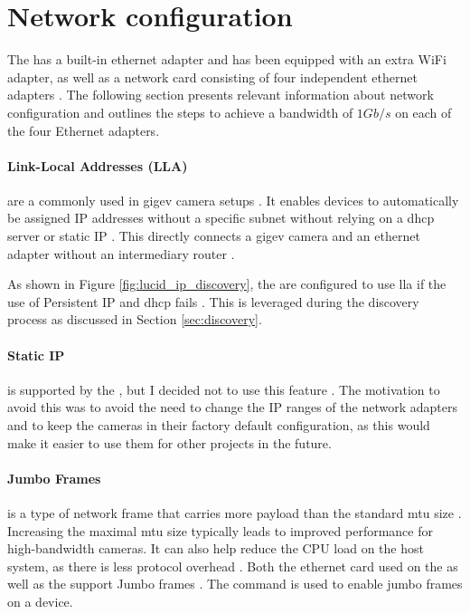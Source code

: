 \section{Network configuration}
\label{sec:network_configuration}
The \jx has a built-in ethernet adapter and has been equipped with an extra WiFi adapter, as well as a network card consisting of four independent ethernet adapters \cite[Section 6.5]{martensPortableSensorRig2022}.
The following section presents relevant information about network configuration and outlines the steps to achieve a bandwidth of $1Gb/s$ on each of the four Ethernet adapters.

\paragraph{Link-Local Addresses (LLA)} are a commonly used in \gls{gigev} camera setups \cite{teledyneSettingIPAddress01} \cite{lucidvisionlabsArenaSoftwareDevelopment2020}.
It enables devices to automatically be assigned IP addresses without a specific subnet without relying on a \gls{dhcp} server or static IP \cite{annieahujaweb2020LinkLocalAddress2022}.
This directly connects a \gls{gigev} camera and an ethernet adapter without an intermediary router \cite{annieahujaweb2020LinkLocalAddress2022}.

As shown in Figure \ref{fig:lucid_ip_discovery}, the \cams are configured to use \gls{lla} if the use of Persistent IP and \gls{dhcp} fails \cite{lucidvisionlabsArenaSoftwareDevelopment2020}.
This is leveraged during the discovery process as discussed in Section \ref{sec:discovery}.

\paragraph{Static IP} is supported by the \cams, but I decided not to use this feature \cite{lucidvisionlabsArenaSoftwareDevelopment2020}.
The motivation to avoid this was to avoid the need to change the IP ranges of the network adapters and to keep the cameras in their factory default configuration, as this would make it easier to use them for other projects in the future.

\paragraph{Jumbo Frames} is a type of network frame that carries more payload than the standard \gls{mtu} size \cite{ieeeIEEEStandardsInterpretation2002} \cite{lucidvisionlabsJumboFramesLUCID2020}.
Increasing the maximal \gls{mtu} size typically leads to improved performance for high-bandwidth cameras.
It can also help reduce the CPU load on the host system, as there is less protocol overhead \cite{lucidvisionlabsJumboFramesLUCID2020} \cite{lukeThingsYouShould2018}.
Both the ethernet card used on the \jx as well as the \cams support Jumbo frames \cite{IntelI350am4Chip} \cite{lucidvisionlabsTritonMPPolarized2020}.
The  command is used to enable jumbo frames on a device.

